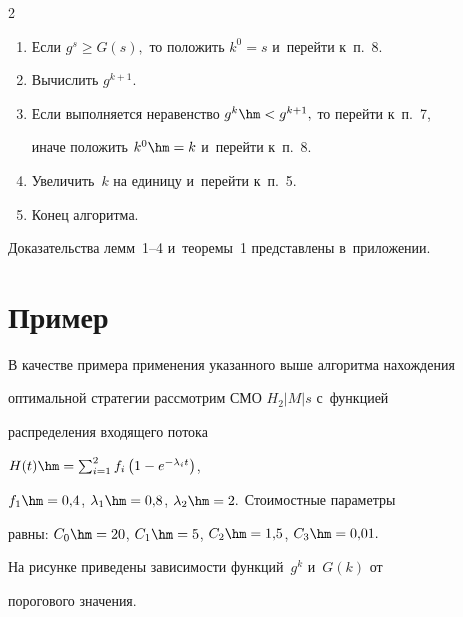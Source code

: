 \begin{multicols}{2}
\begin{enumerate}[1.]
\item Если $g^s\geqslant G(s),$ то положить $k^0=s$ и~перейти к~п.~8.





\item Вычислить $g^{k+1}.$





\item Если выполняется неравенство $g^k\hm<g^{k+1},$ то перейти к~п.~7, 


иначе положить $k^0\hm=k$ и~пе\-рейти к~п.~8.





\item Увеличить~$k$ на единицу и~перейти к~п.~5.





\item Конец алгоритма.


\end{enumerate}





Доказательства лемм~1--4 и~тео\-ре\-мы~1 пред\-став\-ле\-ны в~приложении.





\section{Пример}





В качестве примера применения указанного выше алгоритма нахождения


оптимальной стратегии рассмотрим СМО $H_2|M|s$ с~функцией


распределения входящего потока


$H(t)\hm=\sum\nolimits_{i=1}^2 f_i\left(1-e^{-\lambda_it}\right)$,


$f_1\hm=0{,}4$, $\lambda_1\hm=0{,}8$, $\lambda_2\hm=2.$ Стоимостные параметры


равны: $C_0\hm=20$, $C_1\hm=5$, $C_2\hm=1{,}5$, $C_3\hm=0{,}01.$





На рисунке приведены зависимости функций~$g^k$ и~$G(k)$ от


порогового значения. 









\end{multicols}
